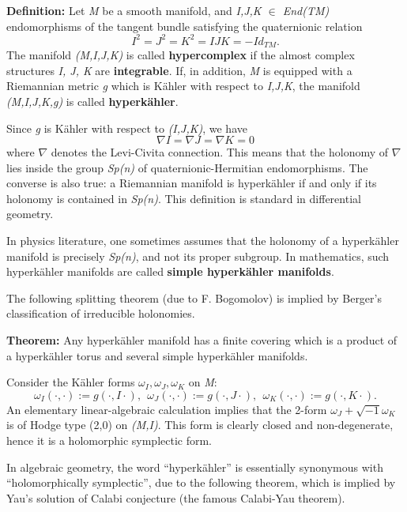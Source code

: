 \documentclass[12pt]{article}
\begin{document}
{\bf Definition:}
Let {\it M} be a smooth manifold, and {\it I,J,K $\in$ End(TM)}
endomorphisms of the tangent bundle satisfying the
quaternionic relation
\[
I^2=J^2=K^2=IJK=-Id_{TM}.
\]
The manifold {\it (M,I,J,K)} is called {\bf hypercomplex}
if the almost complex structures {\it I, J, K}
are {\bf integrable}. If, in addition, {\it M}
is equipped with a Riemannian metric {\it g} which
is K\"ahler with respect to {\it I,J,K}, the
manifold {\it (M,I,J,K,g)} is called {\bf hyperk\"ahler}. 

\hfill

Since {\it g} is K\"ahler with respect to
{\it (I,J,K)}, we have
\[
\nabla I = \nabla J = \nabla K=0
\]
where $\nabla$ denotes the Levi-Civita connection.
This means that the holonomy of $\nabla$ lies inside
the group {\it Sp(n)} of quaternionic-Hermitian
endomorphisms. The converse is also true: a
Riemannian manifold is hyperk\"ahler if and only
if its holonomy is contained in {\it Sp(n)}.
This definition is standard in differential
geometry. 

In physics literature, one sometimes assumes 
that  the holonomy of a hyperk\"ahler manifold is 
precisely {\it Sp(n)}, and not its proper
subgroup. In mathematics, such hyperk\"ahler
manifolds are called {\bf simple hyperk\"ahler manifolds}.

The following splitting theorem (due to F. Bogomolov)
is implied by Berger's classification of irreducible 
holonomies.

\hfill

{\bf Theorem:} Any hyperk\"ahler
manifold has a finite covering which is a product
of a hyperk\"ahler torus and several simple
hyperk\"ahler manifolds.

\hfill


Consider the K\"ahler forms $\omega_I, \omega_J, \omega_K$
on {\it M}:
\[
\omega_I(\cdot, \cdot):= g(\cdot, I\cdot), \ \
\omega_J(\cdot, \cdot):= g(\cdot, J\cdot), \ \
\omega_K(\cdot, \cdot):= g(\cdot, K\cdot).
\]
An elementary linear-algebraic calculation implies
that the 2-form $\omega_J+\sqrt{-1}\omega_K$ is of Hodge type (2,0)
on {\it (M,I)}. This form is clearly closed and
non-degenerate, hence it is a holomorphic 
symplectic form.

In algebraic geometry, the word ``hyperk\"ahler''
is essentially synonymous with ``holomorphically
symplectic'', due to the following theorem, which is
implied by Yau's solution of Calabi conjecture
(the famous Calabi-Yau theorem).

\hfill
\end{document}
